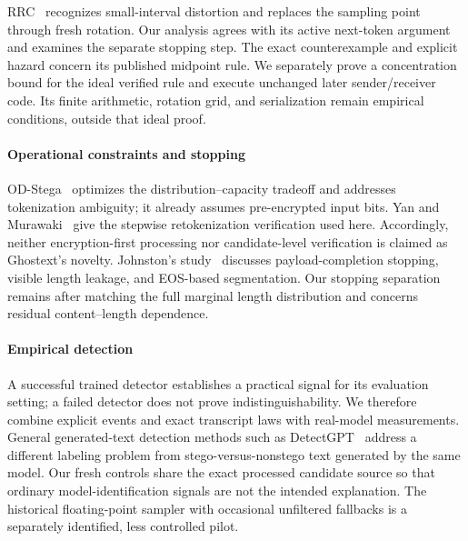 RRC~\cite{yan2026rrc} recognizes small-interval distortion and replaces the
sampling point through fresh rotation. Our analysis agrees with its active
next-token argument and examines the separate stopping step. The exact
counterexample and explicit hazard concern its published midpoint rule.
We separately prove a concentration bound for the ideal verified rule and
execute unchanged later sender/receiver code. Its finite arithmetic, rotation
grid, and serialization remain empirical conditions, outside that ideal proof.

\paragraph{Operational constraints and stopping}
OD-Stega~\cite{huang2026odstega} optimizes the distribution--capacity tradeoff and
addresses tokenization ambiguity; it already assumes pre-encrypted input bits.
Yan and Murawaki~\cite{yan2025tokenization} give the stepwise retokenization
verification used here. Accordingly, neither encryption-first processing nor
candidate-level verification is claimed as Ghostext's novelty. Johnston's
study~\cite{johnston2026entropy} discusses payload-completion stopping, visible
length leakage, and EOS-based segmentation. Our stopping separation remains
after matching the full marginal length distribution and concerns residual
content--length dependence.

\paragraph{Empirical detection}
A successful trained detector establishes a practical signal for its evaluation
setting; a failed detector does not prove indistinguishability. We therefore
combine explicit events and exact transcript laws with real-model measurements.
General generated-text detection methods such as DetectGPT~\cite{mitchell2023detectgpt}
address a different labeling problem from stego-versus-nonstego text generated
by the same model. Our fresh controls share the exact processed candidate
source so that ordinary model-identification signals are not the intended
explanation. The historical floating-point sampler with occasional unfiltered
fallbacks is a separately identified, less controlled pilot.
